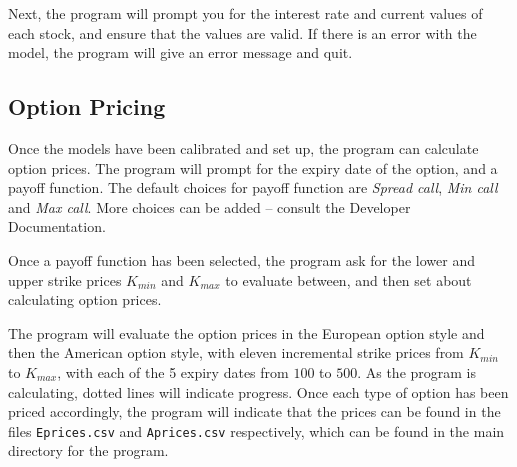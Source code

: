 \documentclass[12pt,a4paper]{article}
\begin{document}
Next, the program will prompt you for the interest rate and current values of each stock, and ensure that the values are valid. If there is an error with the model, the program will give an error message and quit.


\subsection{Option Pricing}
Once the models have been calibrated and set up, the program can calculate option prices. The program will prompt for the expiry date of the option, and a payoff function. The default choices for payoff function are \textit{Spread call}, \textit{Min call} and \textit{Max call}. More choices can be added -- consult the Developer Documentation.

Once a payoff function has been selected, the program ask for the lower and upper strike prices $K_{min}$ and $K_{max}$ to evaluate between, and then set about calculating option prices.

The program will evaluate the option prices in the European option style and then the American option style, with eleven incremental strike prices from $K_{min}$ to $K_{max}$, with each of the 5 expiry dates from $100$ to $500$. As the program is calculating, dotted lines will indicate progress. Once each type of option has been  priced accordingly, the program will indicate that the prices can be found in the files \texttt{Eprices.csv} and \texttt{Aprices.csv} respectively, which can be found in the main directory for the program.
\end{document}
